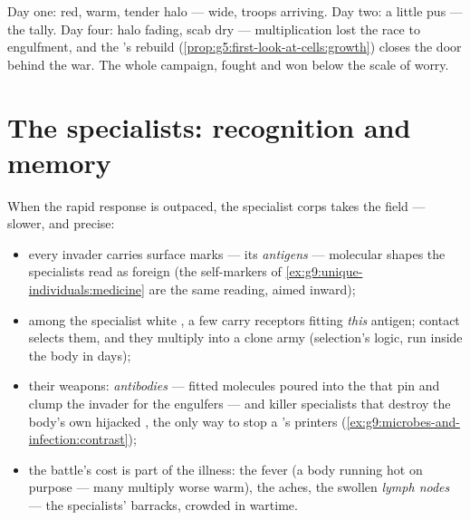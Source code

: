\begin{example}\label{ex:g9:immune-defenses:cut}
Day one: red, warm, tender halo ---  wide, troops
arriving. Day two: a little pus --- the tally. Day four:
halo fading, scab dry --- multiplication lost the race to
engulfment, and the 's rebuild
(\cref{prop:g5:first-look-at-cells:growth}) closes the
door behind the war. The whole campaign, fought and won
below the scale of worry.
\end{example}

\section{The specialists: recognition and memory}

\begin{proposition}\label{prop:g9:immune-defenses:specific}
When the rapid response is outpaced, the specialist corps
takes the field --- slower, and precise:
\begin{itemize}
  \item every invader carries surface marks --- its
        \emph{antigens} --- molecular
        shapes the specialists read as foreign (the
        self-markers of
        \cref{ex:g9:unique-individuals:medicine} are the
        same reading, aimed inward);
  \item among the specialist white , a few carry
        receptors fitting \emph{this} antigen; contact
        selects them, and they multiply into a clone army
        (selection's logic, run inside the body in days);
  \item their weapons: \emph{antibodies}
        --- fitted molecules poured into the  that
        pin and clump the invader for the engulfers ---
        and killer specialists that destroy the body's own
        hijacked , the only way to stop a 's
        printers (\cref{ex:g9:microbes-and-infection:contrast});
  \item the battle's cost is part of the illness: the
        fever (a body running hot on purpose --- many
         multiply worse warm), the aches, the
        swollen \emph{lymph nodes} --- the specialists'
        barracks, crowded in wartime.
\end{itemize}
\end{proposition}
\admitted

